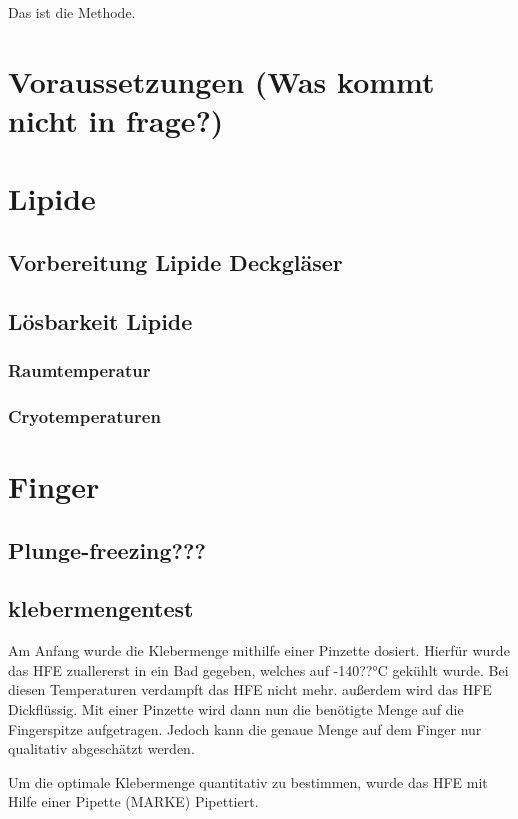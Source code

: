 Das ist die Methode.

\section{Voraussetzungen (Was kommt nicht in frage?)}

\section{Lipide}

\subsection{Vorbereitung Lipide Deckgläser}

\subsection{Lösbarkeit Lipide}

\subsubsection{Raumtemperatur}

\subsubsection{Cryotemperaturen}

\section{Finger}

\subsection{Plunge-freezing???}

\subsection{klebermengentest}
Am Anfang wurde die Klebermenge mithilfe einer Pinzette dosiert. Hierfür wurde das HFE zuallererst in ein Bad gegeben, welches auf -140??°C gekühlt wurde. Bei diesen Temperaturen verdampft das HFE nicht mehr. außerdem wird das HFE Dickflüssig. Mit einer Pinzette wird dann nun die benötigte Menge auf die Fingerspitze aufgetragen. Jedoch kann die genaue Menge auf dem Finger nur qualitativ abgeschätzt werden.

Um die optimale Klebermenge quantitativ zu bestimmen, wurde das HFE mit Hilfe einer Pipette (MARKE) Pipettiert. 

